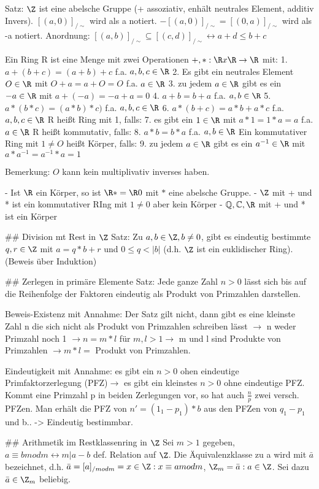 \documentclass[10pt,landscape]{article}
\begin{document}
\begin{multicols}{3}
{{Satz: $\Z$ ist eine abelsche Gruppe (+ assoziativ, enhält neutrales Element, additiv Invers).
$[(a,0)]_{/\sim }$ wird als a notiert. $-[(a,0)]_{/\sim }=[(0,a)]_{/\sim }$ wird als -a notiert.
Anordnung: $[(a,b)]_{/\sim } \subseteq [(c,d)]_{/\sim } \leftrightarrow a+d\leq b+c$

Ein Ring R ist eine Menge mit zwei Operationen $+,*: \R x\R \rightarrow \R$ mit:
1. $a+(b+c) = (a+b)+c$ f.a. $a,b,c\in \R$
2. Es gibt ein neutrales Element $O\in \R$ mit $O+a=a+O=O$ f.a. $a\in\R$
3. zu jedem $a\in\R$ gibt es ein $-a\in \R$ mit $a+(-a)=-a+a=0$
4. $a+b=b+a$ f.a. $a,b\in\R$
5. $a*(b*c)=(a*b)*c)$ f.a. $a,b,c\in\R$
6. $a*(b+c)=a*b+a*c$ f.a. $a,b,c\in\R$
R heißt Ring mit 1, falls:
7. es gibt ein $1\in\R$ mit $a*1=1*a=a$ f.a. $a\in\R$
R heißt kommutativ, falls:
8. $a*b=b*a$ f.a. $a,b\in\R$
Ein kommutativer Ring mit $1\not=O$ heißt Körper, falls:
9. zu jedem $a\in\R$ gibt es ein $a^{-1}\in\R$ mit $a*a^{-1}=a^{-1}*a=1$

Bemerkung: $O$ kann kein multiplivativ inverses haben.

- Ist $\R$ ein Körper, so ist $\R*=\R\\{0}$ mit $*$ eine abelsche Gruppe.
- $\Z$ mit + und * ist ein kommutativer RIng mit $1\not=0$ aber kein Körper
- $\mathbb{Q}, \mathbb{C}, \R$ mit + und * ist ein Körper

## Division mt Rest in $\Z$
Satz: Zu $a,b\in\Z, b\not=0$, gibt es eindeutig bestimmte $q,r\in\Z$ mit $a=q*b+r$ und $0\leq q <|b|$ (d.h. $\Z$ ist ein euklidischer Ring). (Beweis über Induktion)

## Zerlegen in primäre Elemente
Satz: Jede ganze Zahl $n>0$ lässt sich bis auf die Reihenfolge der Faktoren eindeutig als Produkt von Primzahlen darstellen.

Beweis-Existenz mit Annahme: Der Satz gilt nicht, dann gibt es eine kleinste Zahl n die sich nicht als Produkt von Primzahlen schreiben lässt $\rightarrow$ n weder Primzahl noch 1 $\rightarrow n=m*l$ für $m,l>1 \rightarrow$ m und l sind Produkte von Primzahlen $\rightarrow m*l=$ Produkt von Primzahlen.

Eindeutigkeit mit Annahme: es gibt ein $n>0$ ohen eindeutige Primfaktorzerlegung (PFZ)$\rightarrow$ es gibt ein kleinstes $n>0$ ohne eindeutige PFZ. Kommt eine Primzahl p in beiden Zerlegungen vor, so hat auch $\frac{n}{p}$ zwei versch. PFZen. Man erhält die PFZ von $n'=(1_1-p_1)*b$ aus den PFZen von $q_1-p_1$ und b.. -> Eindeutig bestimmbar.

## Arithmetik im Restklassenring in $\Z$
Sei $m>1$ gegeben, $a\equiv b mod m \leftrightarrow m|a-b$ def. Relation auf $\Z$. Die Äquivalenzklasse zu a wird mit $\bar{a}$ bezeichnet, d.h. $\bar{a}=[a]_{/mod m}={x\in \Z: x\equiv a mod m}$, $\Z_m={\bar{a}:a\in\Z}$. Sei dazu $\bar{a}\in\Z_m$ beliebig.

}}
\end{multicols}
\end{document}
